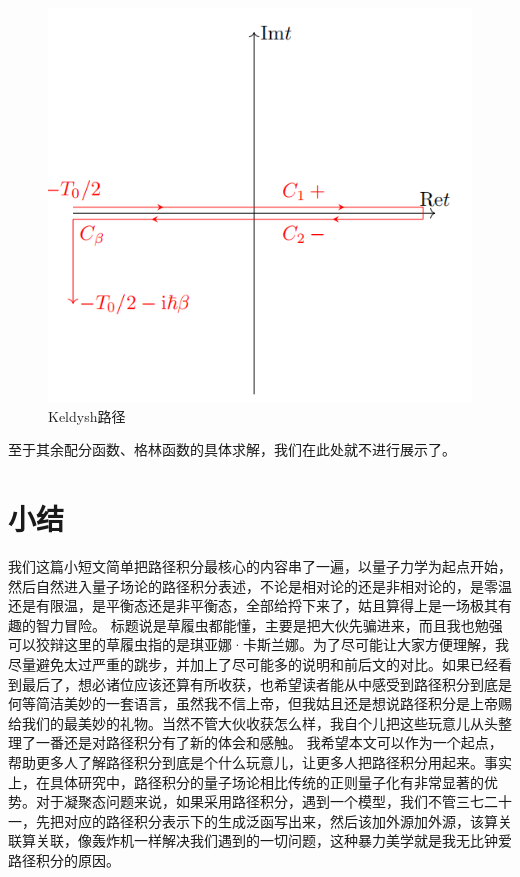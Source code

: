 \documentclass[12pt, a4paper, oneside]{ctexart}
\begin{document}
\begin{figure}[h!]
    \centering
    \includegraphics[width=1\textwidth]{Keldysh_contour.png}
    \caption{Keldysh路径\cite{e}}\label{Keldysh}
\end{figure}

至于其余配分函数、格林函数的具体求解，我们在此处就不进行展示了。

\section{小结}
我们这篇小短文简单把路径积分最核心的内容串了一遍，以量子力学为起点开始，然后自然进入量子场论的路径积分表述，不论是相对论的还是非相对论的，是零温还是有限温，是平衡态还是非平衡态，全部给捋下来了，姑且算得上是一场极其有趣的智力冒险。
标题说是草履虫都能懂，主要是把大伙先骗进来，而且我也勉强可以狡辩这里的草履虫指的是琪亚娜·卡斯兰娜。为了尽可能让大家方便理解，我尽量避免太过严重的跳步，并加上了尽可能多的说明和前后文的对比。如果已经看到最后了，想必诸位应该还算有所收获，也希望读者能从中感受到路径积分到底是何等简洁美妙的一套语言，虽然我不信上帝，但我姑且还是想说路径积分是上帝赐给我们的最美妙的礼物。当然不管大伙收获怎么样，我自个儿把这些玩意儿从头整理了一番还是对路径积分有了新的体会和感触。
我希望本文可以作为一个起点，帮助更多人了解路径积分到底是个什么玩意儿，让更多人把路径积分用起来。事实上，在具体研究中，路径积分的量子场论相比传统的正则量子化有非常显著的优势。对于凝聚态问题来说，如果采用路径积分，遇到一个模型，我们不管三七二十一，先把对应的路径积分表示下的生成泛函写出来，然后该加外源加外源，该算关联算关联，像轰炸机一样解决我们遇到的一切问题，这种暴力美学就是我无比钟爱路径积分的原因。
\end{document}
